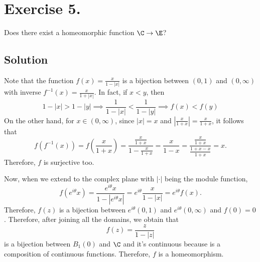 
\section{Exercise 5.} Does there exist a homeomorphic function $\C \to \E$?

\subsection*{Solution}

Note that the function $f(x) = \frac{x}{1-|x|} $ is a bijection between $(0,1)$ and $(0,\infty)$ with inverse $f^{-1}(x) = \frac{x}{1+|x|}$. In fact, if $x < y$, then
\[ 1-|x| > 1-|y| \implies \frac{1}{1-|x|} < \frac{1}{1-|y|} \implies f(x) < f(y) \]
On the other hand, for $x \in (0,\infty)$, since $|x| = x$ and $\left| \frac{x}{1+x} \right| = \frac{x}{1+x}$, it follows that
\[ f(f^{-1}(x)) = f\left( \frac{x}{1+x} \right) = \frac{\frac{x}{1+x}}{1- \frac{x}{1+x}} = \frac{x}{1-x} = \frac{\frac{x}{1+x}}{\frac{1+x-x}{1+x}} = x. \]
Therefore, $f$ is surjective too.

Now, when we extend to the complex plane with $|\cdot|$ being the module function,
\[ f(e^{i\theta} x) = \frac{e^{i\theta} x}{1 - |e^{i\theta} x|} = e^{i\theta}\frac{ x}{1 - |x|} = e^{i\theta} f(x). \]
Therefore, $f(z)$ is a bijection between $e^{i\theta} (0,1)$ and $e^{i\theta} (0,\infty)$ and $f(0) = 0$. Therefore, after joining all the domains, we obtain that
\[ f(z) = \frac{z}{1-|z|} \]
is a bijection between $B_1(0)$ and $\C$ and it's continuous because is a composition of continuous functions. Therefore, $f$ is a homeomorphism.